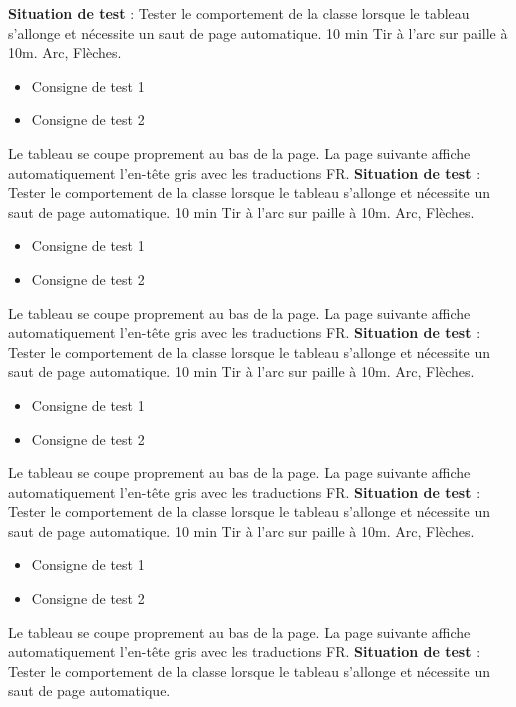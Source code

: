 \documentclass{../tex/ficheseance}
\begin{document}
	
	\makeficheheader
	
	\begin{tableauSeance}		
		\ligneSeance
		{\textbf{Situation de test} : Tester le comportement de la classe lorsque le tableau s'allonge et nécessite un saut de page automatique.}
		{10 min}
		{Tir à l'arc sur paille à 10m.}
		{Arc, Flèches.}
		{\begin{itemize}
			\item Consigne de test 1
			\item Consigne de test 2
		\end{itemize}}
		{Le tableau se coupe proprement au bas de la page.}
		{La page suivante affiche automatiquement l'en-tête gris avec les traductions FR.}		
		\ligneSeance
		{\textbf{Situation de test} : Tester le comportement de la classe lorsque le tableau s'allonge et nécessite un saut de page automatique.}
		{10 min}
		{Tir à l'arc sur paille à 10m.}
		{Arc, Flèches.}
		{\begin{itemize}
			\item Consigne de test 1
			\item Consigne de test 2
		\end{itemize}}
		{Le tableau se coupe proprement au bas de la page.}
		{La page suivante affiche automatiquement l'en-tête gris avec les traductions FR.}		
		\ligneSeance
		{\textbf{Situation de test} : Tester le comportement de la classe lorsque le tableau s'allonge et nécessite un saut de page automatique.}
		{10 min}
		{Tir à l'arc sur paille à 10m.}
		{Arc, Flèches.}
		{\begin{itemize}
			\item Consigne de test 1
			\item Consigne de test 2
		\end{itemize}}
		{Le tableau se coupe proprement au bas de la page.}
		{La page suivante affiche automatiquement l'en-tête gris avec les traductions FR.}		
		\ligneSeance
		{\textbf{Situation de test} : Tester le comportement de la classe lorsque le tableau s'allonge et nécessite un saut de page automatique.}
		{10 min}
		{Tir à l'arc sur paille à 10m.}
		{Arc, Flèches.}
		{\begin{itemize}
			\item Consigne de test 1
			\item Consigne de test 2
		\end{itemize}}
		{Le tableau se coupe proprement au bas de la page.}
		{La page suivante affiche automatiquement l'en-tête gris avec les traductions FR.}		
		\ligneSeance
		{\textbf{Situation de test} : Tester le comportement de la classe lorsque le tableau s'allonge et nécessite un saut de page automatique.}

\end{tableauSeance}
\end{document}

